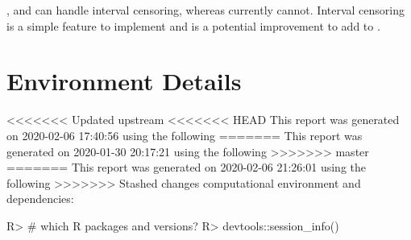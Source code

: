 \documentclass[
]{jss}
\begin{document}
\begin{CodeChunk}
\begin{CodeInput}
,  and  can handle interval
censoring, whereas  currently cannot. Interval censoring
is a simple feature to implement and is a potential improvement to add
to .

\hypertarget{environment-details}{%
\section{Environment Details}\label{environment-details}}

<<<<<<< Updated upstream
<<<<<<< HEAD
This report was generated on 2020-02-06 17:40:56 using the following
=======
This report was generated on 2020-01-30 20:17:21 using the following
>>>>>>> master
=======
This report was generated on 2020-02-06 21:26:01 using the following
>>>>>>> Stashed changes
computational environment and dependencies:

\begin{CodeChunk}

\begin{CodeInput}
R> # which R packages and versions?
R> devtools::session_info()
\end{CodeInput}


\end{CodeChunk}
\end{CodeInput}
\end{CodeChunk}
\end{document}
